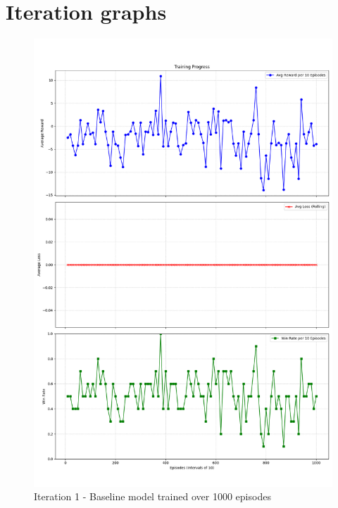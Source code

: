 \section{Iteration graphs}
\label{appendix:iteration-graphs}

\begin{figure}[H]
    \includegraphics[width=.8\textwidth]{assets/Iteration-1-graphs.png}
    \caption{Iteration 1 - Baseline model trained over 1000 episodes}
    \label{fig:iteration-1-graphs}
\end{figure}

